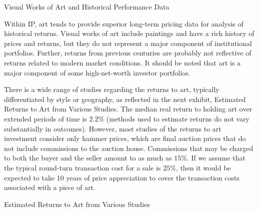 \documentclass[11pt]{article}
\begin{document}
Visual Works of Art and Historical Performance Data

Within IP, art tends to provide superior long-term pricing data for analysis of historical returns. Visual works of art include paintings and have a rich history of prices and returns, but they do not represent a major component of institutional portfolios. Further, returns from previous centuries are probably not reflective of returns related to modern market conditions. It should be noted that art is a major component of some high-net-worth investor portfolios.

There is a wide range of studies regarding the returns to art, typically differentiated by style or geography, as reflected in the next exhibit, Estimated Returns to Art from Various Studies. The median real return to holding art over extended periods of time is $2.2 \%$ (methods used to estimate returns do not vary substantially in outcomes). However, most studies of the returns to art investment consider only hammer prices, which are final auction prices that do not include commissions to the auction house. Commissions that may be charged to both the buyer and the seller amount to as much as $15 \%$. If we assume that the typical round-turn transaction cost for a sale is $25 \%$, then it would be expected to take 10 years of price appreciation to cover the transaction costs associated with a piece of art.

Estimated Returns to Art from Various Studies
\end{document}
